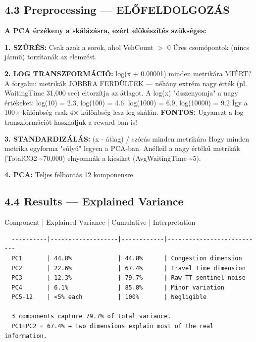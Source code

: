 \documentclass[11pt,a4paper]{article}
\begin{document}
\subsection*{4.3 Preprocessing — ELŐFELDOLGOZÁS}
\textbf{A PCA érzékeny a skálázásra, ezért előkészítés szükséges:}

\textbf{1. SZŰRÉS:} Csak azok a sorok, ahol VehCount $>$ 0
Üres csomópontok (nincs jármű) torzítanák az elemzést.

\textbf{2. LOG TRANSZFORMÁCIÓ:} log(x + 0.00001) minden metrikára
MIÉRT? A forgalmi metrikák JOBBRA FERDÜLTEK — néhány extrém
nagy érték (pl. WaitingTime 31,000 sec) eltorzítja az átlagot.
A log(x) "összenyomja" a nagy értékeket:
log(10) = 2.3, log(100) = 4.6, log(1000) = 6.9, log(10000) = 9.2
Így a 100× különbség csak 4× különbség lesz log skálán.
\textbf{FONTOS:} Ugyanezt a log transzformációt használjuk a reward-ban is!

\textbf{3. STANDARDIZÁLÁS:} (x - átlag) / szórás minden metrikára
Hogy minden metrika egyforma "súlyú" legyen a PCA-ban.
Anélkül a nagy értékű metrikák (TotalCO2 \textasciitilde{}70,000) elnyomnák
a kicsiket (AvgWaitingTime \textasciitilde{}5).

\textbf{4. PCA:} Teljes felbontás 12 komponensre

\subsection*{4.4 Results — Explained Variance}
Component | Explained Variance | Cumulative | Interpretation
\vspace{1em}\begin{verbatim}
  ----------|-------------------|------------|---------------------------
  PC1       | 44.8%             | 44.8%      | Congestion dimension
  PC2       | 22.6%             | 67.4%      | Travel Time dimension
  PC3       | 12.3%             | 79.7%      | Raw TT sentinel noise
  PC4       | 6.1%              | 85.8%      | Minor variation
  PC5-12    | <5% each          | 100%       | Negligible

  3 components capture 79.7% of total variance.
  PC1+PC2 = 67.4% → two dimensions explain most of the real information.

\end{verbatim}
\end{document}
